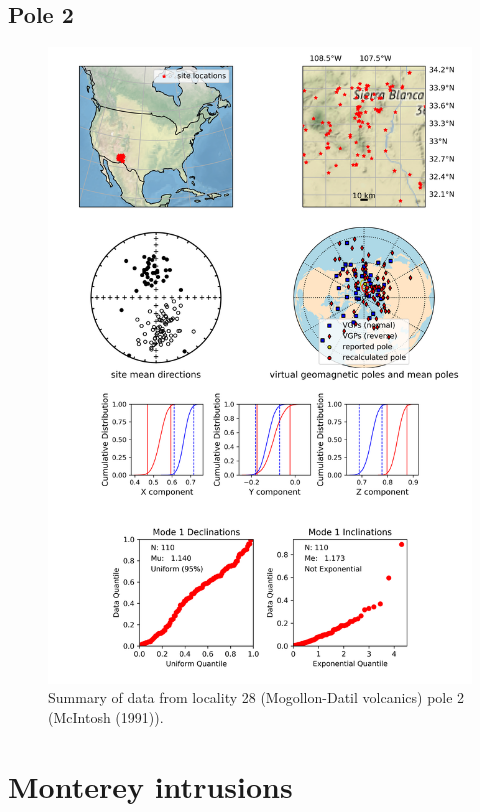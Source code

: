 \subsection{Pole 2}


\begin{figure}[H]
\centering
\includegraphics[width=5 in]{./28/2/pole_summary.png}
\caption{Summary of data from locality 28 (Mogollon-Datil volcanics) pole 2 (McIntosh (1991)).}
\end{figure}

\section{Monterey intrusions}
